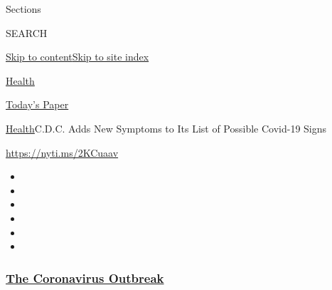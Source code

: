 Sections

SEARCH

\protect\hyperlink{site-content}{Skip to
content}\protect\hyperlink{site-index}{Skip to site index}

\href{https://www.nytimes3xbfgragh.onion/section/health}{Health}

\href{https://myaccount.nytimes3xbfgragh.onion/auth/login?response_type=cookie\&client_id=vi}{}

\href{https://www.nytimes3xbfgragh.onion/section/todayspaper}{Today's
Paper}

\href{/section/health}{Health}\textbar{}C.D.C. Adds New Symptoms to Its
List of Possible Covid-19 Signs

\url{https://nyti.ms/2KCuaav}

\begin{itemize}
\item
\item
\item
\item
\item
\item
\end{itemize}

\hypertarget{the-coronavirus-outbreak}{%
\subsubsection{\texorpdfstring{\href{https://www.nytimes3xbfgragh.onion/news-event/coronavirus?name=styln-coronavirus-national\&region=TOP_BANNER\&block=storyline_menu_recirc\&action=click\&pgtype=Article\&impression_id=5aee1790-efba-11ea-9102-5f07916f2c42\&variant=undefined}{The
Coronavirus
Outbreak}}{The Coronavirus Outbreak}}\label{the-coronavirus-outbreak}}

